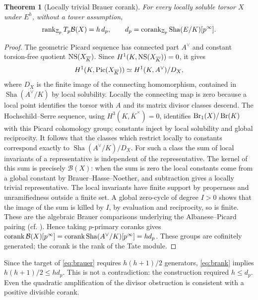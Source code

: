 \documentclass[11pt,a4paper]{article}
\newtheorem{theorem}{Theorem}[section]
\theoremstyle{definition}\newtheorem{definition}[theorem]{Definition}
\theoremstyle{remark}\newtheorem{remark}[theorem]{Remark}
\newcommand{\Sha}{\operatorname{\mathrm{Sha}}}
\newcommand{\ZZ}{\mathbb Z}\newcommand{\QQ}{\mathbb Q}\newcommand{\FF}{\mathbb F}
\numberwithin{equation}{section}
\begin{document}
\begin{theorem}[Locally trivial Brauer corank]\label{thm:brank}
For every locally soluble torsor $X$ under $E^h$, without a tower assumption,
\begin{equation}\label{eq:brank}
\rk_{\ZZ_p}T_p\mathcal B(X)=h\,d_p,
\qquad d_p=\corank_{\ZZ_p}\Sha(E/K)[p^\infty].
\end{equation}
\end{theorem}
\begin{proof}
The geometric Picard sequence has connected part $A^\vee$ and constant torsion-free quotient $\operatorname{NS}(X_{\overline K})$. Since $H^1(K,\operatorname{NS}(X_{\overline K}))=0$, it gives
\[
H^1(K,\operatorname{Pic}(X_{\overline K}))\simeq H^1(K,A^\vee)/D_X,
\]
where $D_X$ is the finite image of the connecting homomorphism, contained in $\Sha(A^\vee/K)$ by local solubility. Locally the connecting map is zero because a local point identifies the torsor with $A$ and its matrix divisor classes descend. The Hochschild--Serre sequence, using $H^3(K,\overline K^\times)=0$, identifies $\operatorname{Br}_1(X)/\operatorname{Br}(K)$ with this Picard cohomology group; constants inject by local solubility and global reciprocity. It follows that the classes which restrict locally to constants correspond exactly to $\Sha(A^\vee/K)/D_X$. For such a class the sum of local invariants of a representative is independent of the representative. The kernel of this sum is precisely $\mathcal B(X)$: when the sum is zero the local constants come from a global constant by Brauer--Hasse--Noether, and subtraction gives a locally trivial representative. The local invariants have finite support by properness and unramifiedness outside a finite set. A global zero-cycle of degree $I>0$ shows that the image of the sum is killed by $I$, by evaluation and reciprocity, so is finite. These are the algebraic Brauer comparisons underlying the Albanese--Picard pairing (cf. \cite{PS}). Hence taking $p$-primary coranks gives $\corank\mathcal B(X)[p^\infty]=\corank\Sha(A^\vee/K)[p^\infty]=hd_p$. These groups are cofinitely generated; the corank is the rank of the Tate module.
\end{proof}
Since the target of \eqref{eq:brauer} requires $h(h+1)/2$ generators, \eqref{eq:brank} implies $h(h+1)/2\leq hd_p$. This is not a contradiction: the construction required $h\leq d_p$. Even the quadratic amplification of the divisor obstruction is consistent with a positive divisible corank.
\end{document}
